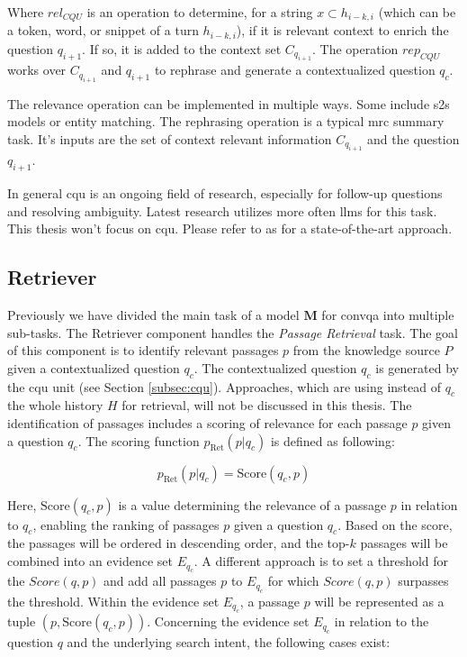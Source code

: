Where $rel_{CQU}$ is an operation to determine, for a string $x \subset h_{i-k,i}$ (which can be a token, word, or snippet of a turn $h_{i-k,i}$), if it is relevant context to enrich the question $q_{i+1}$. If so, it is added to the context set $C_{q_{i+1}}$. The operation $rep_{CQU}$ works over $C_{q_{i+1}}$ and $q_{i+1}$ to rephrase and generate a contextualized question $q_c$.

The relevance operation can be implemented in multiple ways. Some include \gls{s2s} models or entity matching. The rephrasing operation is a typical \gls{mrc} summary task. It's inputs are the set of context relevant information $C_{q_{i+1}}$ and the question $q_{i+1}$.

In general \gls{cqu} is an ongoing field of research, especially for follow-up questions and resolving ambiguity. Latest research utilizes more often \gls{llm}s for this task. This thesis won't focus on \gls{cqu}. Please refer to \cite{mao_large_2023} as for a state-of-the-art approach.

\subsection{Retriever}
\label{subsec:retriever}

Previously we have divided the main task of a model $\mathbf{M}$ for \gls{convqa} into multiple sub-tasks. The Retriever component handles the \textit{Passage Retrieval} task. The goal of this component is to identify relevant passages $p$ from the knowledge source $P$ given a contextualized question $q_c$. The contextualized question $q_c$ is generated by the \gls{cqu} unit (see Section \ref{subsec:cqu}). Approaches, which are using instead of $q_c$ the whole history $H$ for retrieval, will not be discussed in this thesis. The identification of passages includes a scoring of relevance for each passage $p$ given a question $q_c$. The scoring function $p_{\text{Ret}}(p|q_c)$ is defined as following:

\begin{equation}
    p_{\text{Ret}}(p|q_c) = \text{Score}(q_c,p)
    \label{eq:retriever}
\end{equation}

Here, $\text{Score}(q_c,p)$ is a value determining the relevance of a passage $p$ in relation to $q_c$, enabling the ranking of passages $p$ given a question $q_c$. Based on the score, the passages will be ordered in descending order, and the top-$k$ passages will be combined into an evidence set $E_{q_c}$. A different approach is to set a threshold for the $Score(q,p)$ and add all passages $p$ to $E_{q_c}$ for which $Score(q,p)$ surpasses the threshold. Within the evidence set $E_{q_c}$, a passage $p$ will be represented as a tuple $(p, \text{Score}(q_c,p))$. Concerning the evidence set $E_{q_c}$ in relation to the question $q$ and the underlying search intent, the following cases exist:

